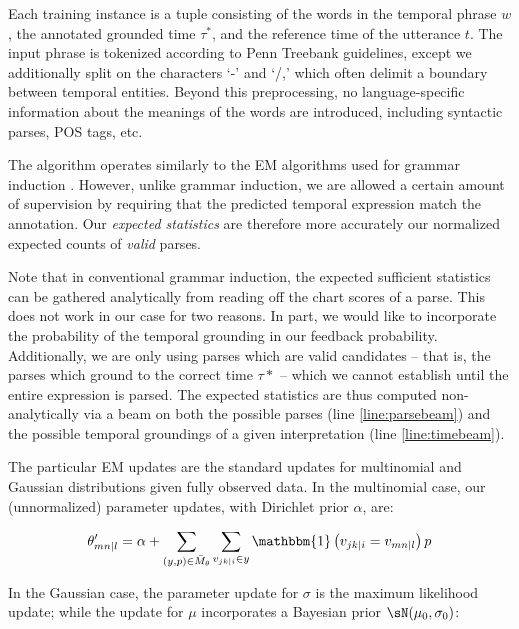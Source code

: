 Each training instance is a tuple consisting of the words in the temporal
	phrase $w$, the annotated grounded time $\tau^*$, and the reference time
	of the utterance $t$.
The input phrase is tokenized according to Penn Treebank guidelines,
	except we additionally split on the characters `-' and `/,' which
	often delimit a boundary between temporal entities.
Beyond this preprocessing, no language-specific information about the meanings
	of the words are introduced, including syntactic parses, POS tags, etc.

The algorithm operates similarly to the EM algorithms used for grammar induction
	\cite{key:2004klein-induction,key:1992carroll-induction}.
However, unlike grammar induction, we are allowed a certain amount of
	supervision by requiring that the predicted temporal expression
	match the annotation.
Our \textit{expected statistics} are therefore more accurately our normalized
	expected counts of \textit{valid} parses.

Note that in conventional grammar induction, the expected sufficient statistics
	can be gathered analytically from reading off the chart scores of a parse.
This does not work in our case for two reasons.
In part, we would like to incorporate the probability of the temporal
	grounding in our feedback probability.
Additionally, we are only using parses which are valid candidates -- that is,
	the parses which ground to the correct time $\tau*$ -- which we cannot establish
	until the entire expression is parsed.
The expected statistics are thus computed non-analytically via
	a beam on both the possible parses (line \ref{line:parsebeam}) and the
	possible temporal groundings of a given interpretation (line
	\ref{line:timebeam}).

The particular EM updates are the standard
	updates for multinomial and Gaussian distributions given fully observed data.
In the multinomial case, our (unnormalized) parameter updates, with
	Dirichlet prior $\alpha$, are:

\begin{equation}
	\theta_{mn \mid l}' =
		\alpha + 
		\sum\limits_{(y,p) \in \bar M_\theta} \sum\limits_{v_{jk \mid i} \in y}
			\mathbbm{1}\left(v_{jk \mid i} = v_{mn \mid l}\right) p
\label{eqn:multinomialEM}
\end{equation}

In the Gaussian case, the parameter update for $\sigma$ is the maximum
	likelihood update; while the update for $\mu$ incorporates a
	Bayesian prior $\sN(\mu_0,\sigma_0)$:


